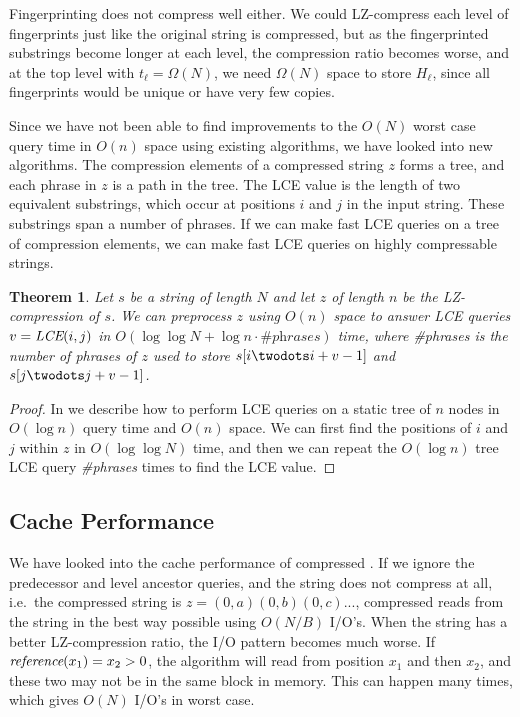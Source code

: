 \documentclass[a4]{article}
\newcommand*{\pref}{\prettyref}
\newtheorem{theorem}{Theorem}
\begin{document}
Fingerprinting does not compress well either. We could LZ-compress each level of fingerprints just like the original string is compressed, but as the fingerprinted substrings become longer at each level, the compression ratio becomes worse, and at the top level with $t_\ell = \Omega(N)$, we need $\Omega(N)$ space to store $H_\ell$, since all fingerprints would be unique or have very few copies.

Since we have not been able to find improvements to the $O(N)$ worst case query time in $O(n)$ space using existing algorithms, we have looked into new algorithms. The compression elements of a compressed string $z$ forms a tree, and each phrase in $z$ is a path in the tree. The LCE value is the length of two equivalent substrings, which occur at positions $i$ and $j$ in the input string. These substrings span a number of phrases. If we can make fast LCE queries on a tree of compression elements, we can make fast LCE queries on highly compressable strings.

\begin{theorem}
\label{thm:lz-tree}
Let $s$ be a string of length $N$ and let $z$ of length $n$ be the LZ-compression of $s$. We can preprocess $z$ using $O(n)$ space to answer LCE queries $v=\textit{LCE}(i,j)$ in $O(\log\log N + \log n \cdot \textit{\#phrases})$ time, where \textit{\#phrases} is the number of phrases of $z$ used to store $s[i\twodots i+v-1]$ and $s[j\twodots j+v-1]$.
\end{theorem}

\begin{proof}
In \pref{sec:tree-lce} we describe how to perform LCE queries on a static tree of $n$ nodes in $O(\log n)$ query time and $O(n)$ space. We can first find the positions of $i$ and $j$ within $z$ in $O(\log\log N)$ time, and then we can repeat the $O(\log n)$ tree LCE query \textit{\#phrases} times to find the LCE value.
\end{proof}

\subsection{Cache Performance}

We have looked into the cache performance of compressed . If we ignore the predecessor and level ancestor queries, and the string does not compress at all, i.e.\ the compressed string is $z=(0,a)(0,b)(0,c)...$, compressed  reads from the string in the best way possible using $O(N/B)$ I/O's. When the string has a better LZ-compression ratio, the I/O pattern becomes much worse. If $\textit{reference}(x_1) = x_2 > 0$, the algorithm will read from position $x_1$ and then $x_2$, and these two may not be in the same block in memory. This can happen many times, which gives $O(N)$ I/O's in worst case.
\end{document}
